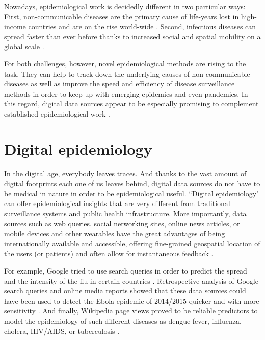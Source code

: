 \documentclass[11pt, a4paper,twoside]{report}\usepackage[]{graphicx}\usepackage[]{color}
\begin{document}
Nowadays, epidemiological work is decidedly different in two particular ways: First, non-communicable diseases are the primary cause of life-years lost in high-income countries and are on the rise world-wide \citep{lozano_global_2013}. Second, infectious diseases can spread faster than ever before thanks to increased social and spatial mobility on a global scale \citep{hufnagel_forecast_2004}. 

For both challenges, however, novel epidemiological methods are rising to the task. They can help to track down the underlying causes of non-communicable diseases as well as improve the speed and efficiency of disease surveillance methods in order to keep up with emerging epidemics and even pandemics. In this regard, digital data sources appear to be especially promising to complement established epidemiological work \citep{salathe_digital_2012, simonsen_infectious_2016}.

\section{Digital epidemiology}

In the digital age, everybody leaves traces. And thanks to the vast amount of digital footprints each one of us leaves behind, digital data sources do not have to be medical in nature in order to be epidemiological useful. ``Digital epidemiology" can offer epidemiological insights that are very different from traditional surveillance systems and public health infrastructure. More importantly, data sources such as web queries, social networking sites, online news articles, or mobile devices and other wearables have the great advantages of being internationally available and accessible, offering fine-grained geospatial location of the users (or patients) and often allow for instantaneous feedback \citep{salathe_digital_2012}. 

For example, Google tried to use search queries in order to predict the spread and the intensity of the flu in certain countries \citep{ginsberg_detecting_2009}. Retrospective analysis of Google search queries and online media reports showed that these data sources could have been used to detect the Ebola epidemic of 2014/2015 quicker and with more sensitivity \citep{anema_digital_2014, milinovich_role_2015}. And finally, Wikipedia page views proved to be reliable predictors to model the epidemiology of such different diseases as dengue fever, influenza, cholera, HIV/AIDS, or tuberculosis \citep{generous_global_2014}. 
\end{document}
